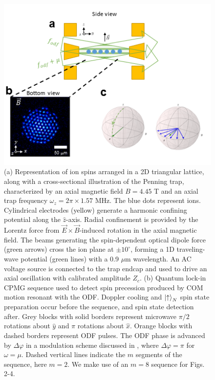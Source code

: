 \documentclass[aps,prl,twocolumn,superscriptaddress,floatfix]{revtex4-1}
\begin{document}
\begin{figure}
    \centering
    \includegraphics[width=\columnwidth]{expt}
    \caption{(a) Representation of ion spins arranged in a 2D triangular lattice, along with a cross-sectional illustration of the Penning trap, characterized by an axial magnetic field $B = 4.45$ T and an axial trap frequency $\omega_z = 2\pi \times 1.57$ MHz. The blue dots represent ions. Cylindrical electrodes (yellow) generate a harmonic confining potential along the $\hat{z}$-axis. Radial confinement is provided by the Lorentz force from $\vec{E} \times \vec{B}$-induced rotation in the axial magnetic field. The beams generating the spin-dependent optical dipole force (green arrows) cross the ion plane at $\pm 10^{\circ}$, forming a 1D traveling-wave potential (green lines) with a 0.9 $\mu$m wavelength. An AC voltage source is connected to the trap endcap and used to drive an axial oscillation with calibrated amplitude $Z_c$. (b) Quantum lock-in CPMG sequence used to detect spin precession produced by COM motion resonant with the ODF. Doppler cooling and $\ket{\uparrow}_N$ spin state preparation occur before the sequence, and spin state detection after. Grey blocks with solid borders represent microwave $\pi/2$ rotations about $\hat{y}$ and $\pi$ rotations about $\hat{x}$. Orange blocks with dashed borders represent ODF pulses. The ODF phase is advanced by $\Delta\varphi$ in a modulation scheme discussed in , where $\Delta\varphi = \pi$ for $\omega = \mu$. Dashed vertical lines indicate the $m$ segments of the sequence, here $m = 2$. We make use of an $m = 8$ sequence for Figs. 2-4.} 
    \label{Expt}
\end{figure}
\end{document}
